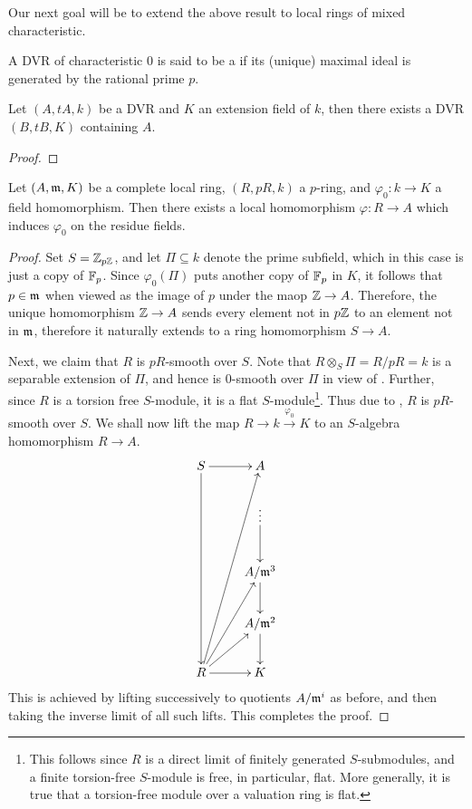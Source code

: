 Our next goal will be to extend the above result to local rings of mixed characteristic.

\begin{definition}
    A DVR of characteristic $0$ is said to be a  if its (unique) maximal ideal is generated by the rational prime $p$.
\end{definition}

\begin{theorem}
    Let $(A, tA, k)$ be a DVR and $K$ an extension field of $k$, then there exists a DVR $(B, tB, K)$ containing $A$.
\end{theorem}
\begin{proof}
\end{proof}

\begin{theorem}
    Let $(A,\mathfrak{m}, K)$ be a complete local ring, $(R, pR, k)$ a $p$-ring, and $\varphi_0\colon k\to K$ a field homomorphism. Then there exists a local homomorphism $\varphi\colon R\to A$ which induces $\varphi_0$ on the residue fields.
\end{theorem}
\begin{proof}
    Set $S = \mathbb{Z}_{p\mathbb{Z}}$, and let $\Pi\subseteq k$ denote the prime subfield, which in this case is just a copy of $\mathbb{F}_p$. Since $\varphi_0(\Pi)$ puts another copy of $\mathbb{F}_p$ in $K$, it follows that $p\in\mathfrak{m}$ when viewed as the image of $p$ under the maop $\mathbb{Z}\to A$. Therefore, the unique homomorphism $\mathbb{Z}\to A$ sends every element not in $p\mathbb{Z}$ to an element not in $\mathfrak{m}$, therefore it naturally extends to a ring homomorphism $S\to A$.

    Next, we claim that $R$ is $pR$-smooth over $S$. Note that $R\otimes_S \Pi = R/pR = k$ is a separable extension of $\Pi$, and hence is $0$-smooth over $\Pi$ in view of . Further, since $R$ is a torsion free $S$-module, it is a flat $S$-module\footnote{This follows since $R$ is a direct limit of finitely generated $S$-submodules, and a finite torsion-free $S$-module is free, in particular, flat. More generally, it is true that a torsion-free module over a valuation ring is flat.}. Thus due to , $R$ is $pR$-smooth over $S$. We shall now lift the map $R\to k\xrightarrow{\varphi_0} K$ to an $S$-algebra homomorphism $R\to A$.
    \begin{equation*}
        \xymatrix {
            S\ar[r]\ar[dddd] & {A}\\
            & \vdots\ar[d]\\
            &  A/\frakm^3\ar[d]\\
            &  A/\frakm^2\ar[d]\\
            R\ar[r]\ar[ru]\ar[ruu]\ar[ruuuu] & K
        }
    \end{equation*}
    This is achieved by lifting successively to quotients $A/\mathfrak{m}^i$ as before, and then taking the inverse limit of all such lifts. This completes the proof.
\end{proof}


